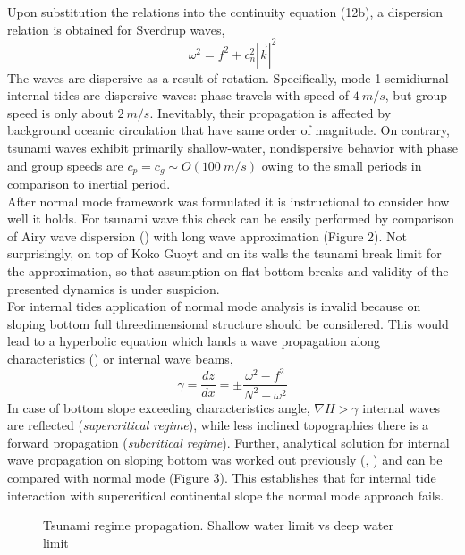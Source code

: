Upon substitution the relations into the continuity equation (12b), a dispersion relation is obtained for Sverdrup waves,
\begin{equation}
\omega^2 = f^2 + c^2_n |\vec{k}|^2
\end{equation}
The waves are dispersive as a result of rotation. Specifically, mode-1 semidiurnal internal tides are dispersive waves: phase travels with speed of $4~m/s$, but group speed is only about $2~m/s$. Inevitably, their propagation is affected by background oceanic circulation that have same order of magnitude. On contrary, tsunami waves exhibit primarily shallow-water, nondispersive behavior with phase and group speeds are $c_p = c_g \sim O(100~m/s)$ owing to the small periods in comparison to inertial period.\\
After normal mode framework was formulated it is instructional to consider how well it holds. For tsunami wave this check can be easily performed by comparison of Airy wave dispersion (\cite{kundu2008fluid}) with long wave approximation (Figure 2). Not surprisingly, on top of Koko Guoyt and on its walls the tsunami break limit for the approximation, so that assumption on flat bottom breaks and validity of the presented dynamics is under suspicion.\\
For internal tides application of normal mode analysis is invalid because on sloping bottom full threedimensional structure should be considered. This would lead to a hyperbolic equation which lands a wave propagation along characteristics (\cite{sandstrom1969effect}) or internal wave beams,
\begin{equation}
\gamma = \frac{dz}{dx} = \pm \frac{\omega^2 - f^2}{N^2 - \omega^2}
\end{equation}
In case of bottom slope exceeding characteristics angle, $\nabla H > \gamma$ internal waves are reflected (\textit{supercritical regime}), while less inclined topographies there is a forward propagation (\textit{subcritical regime}). Further, analytical solution for internal wave propagation on sloping bottom was worked out previously (\cite{wunsch1968propagation}, \cite{wunsch1969progressive}) and can be compared with normal mode (Figure 3). This establishes that for internal tide interaction with supercritical continental slope the normal mode approach fails. 

\begin{figure}
\caption{Tsunami regime propagation. Shallow water limit vs deep water limit}
\end{figure}

